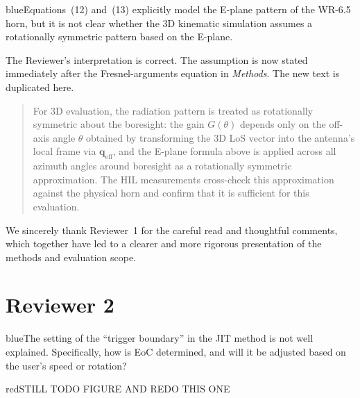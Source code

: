 \documentclass{article}
\newcommand{\blue}[1]{\begin{color}{blue}#1\end{color}}
\newcommand{\red}[1]{\begin{color}{red}#1\end{color}}
\begin{document}
\begin{tcbremark}
{\selectfont
\blue{Equations~(12) and~(13) explicitly model the E-plane pattern of the WR-6.5 horn, but it is not clear whether the 3D kinematic simulation assumes a rotationally symmetric pattern based on the E-plane.}
}
\end{tcbremark}

\noindent The Reviewer's interpretation is correct. The assumption is now stated immediately after the Fresnel-arguments equation in \emph{Methods}. The new text is duplicated here.

\begin{quote}
{\color{cyan!75!black}
For 3D evaluation, the radiation pattern is treated as rotationally symmetric about the boresight: the gain $G(\theta)$ depends only on the off-axis angle $\theta$ obtained by transforming the 3D LoS vector into the antenna's local frame via $\mathbf{q}_{\text{eff}}$, and the E-plane formula above is applied across all azimuth angles around boresight as a rotationally symmetric approximation. The HIL measurements cross-check this approximation against the physical horn and confirm that it is sufficient for this evaluation.
}
\end{quote}

\bigskip
\noindent We sincerely thank Reviewer~1 for the careful read and thoughtful comments, which together have led to a clearer and more rigorous presentation of the methods and evaluation scope.

\newpage

\section*{Reviewer 2}

\begin{tcbremark}
{\selectfont
\blue{The setting of the ``trigger boundary'' in the JIT method is not well explained. Specifically, how is EoC determined, and will it be adjusted based on the user's speed or rotation?}
}
\end{tcbremark}


\red{STILL TODO FIGURE AND REDO THIS ONE}
\end{document}
